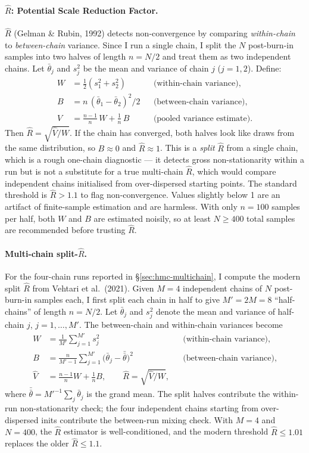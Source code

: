 \documentclass{article}
\begin{document}
\paragraph{$\hat{R}$: Potential Scale Reduction Factor.}
$\hat{R}$ (Gelman \& Rubin, 1992) detects non-convergence by comparing \emph{within-chain} to \emph{between-chain} variance. Since I run a single chain, I split the $N$ post-burn-in samples into two halves of length $n = N/2$ and treat them as two independent chains. Let $\bar\theta_j$ and $s_j^2$ be the mean and variance of chain $j$ ($j = 1, 2$). Define:
\begin{align}
W &= \tfrac{1}{2}(s_1^2 + s_2^2) && \text{(within-chain variance)}, \\
B &= n\,(\bar\theta_1 - \bar\theta_2)^2 / 2 && \text{(between-chain variance)}, \\
\hat{V} &= \tfrac{n-1}{n}\,W + \tfrac{1}{n}\,B && \text{(pooled variance estimate)}.
\end{align}
Then $\hat{R} = \sqrt{\hat{V}/W}$. If the chain has converged, both halves look like draws from the same distribution, so $B \approx 0$ and $\hat{R} \approx 1$. This is a \emph{split} $\hat{R}$ from a single chain, which is a rough one-chain diagnostic --- it detects gross non-stationarity within a run but is not a substitute for a true multi-chain $\hat{R}$, which would compare independent chains initialised from over-dispersed starting points. The standard threshold is $\hat{R} > 1.1$ to flag non-convergence. Values slightly below 1 are an artifact of finite-sample estimation and are harmless. With only $n = 100$ samples per half, both $W$ and $B$ are estimated noisily, so at least $N \geq 400$ total samples are recommended before trusting $\hat{R}$.

\paragraph{Multi-chain split-$\hat R$.}
For the four-chain runs reported in \S\ref{sec:hmc-multichain}, I compute the modern split $\hat R$ from Vehtari et al.\ (2021). Given $M = 4$ independent chains of $N$ post-burn-in samples each, I first split each chain in half to give $M' = 2M = 8$ ``half-chains'' of length $n = N/2$. Let $\bar\theta_j$ and $s_j^2$ denote the mean and variance of half-chain $j$, $j = 1, \ldots, M'$. The between-chain and within-chain variances become
\begin{align}
W &= \frac{1}{M'}\sum_{j=1}^{M'} s_j^2&& \text{(within-chain variance)}, \\
B &= \frac{n}{M' - 1}\sum_{j=1}^{M'} \bigl(\bar\theta_j - \bar{\bar\theta}\bigr)^2 && \text{(between-chain variance)}, \\
\hat V &= \frac{n-1}{n} W + \frac{1}{n} B, \qquad \hat R = \sqrt{\hat V / W},
\label{eq:rhat-multichain}
\end{align}
where $\bar{\bar\theta} = M'^{-1}\sum_j \bar\theta_j$ is the grand mean. The split halves contribute the within-run non-stationarity check; the four independent chains starting from over-dispersed inits contribute the between-run mixing check. With $M = 4$ and $N = 400$, the $\hat R$ estimator is well-conditioned, and the modern threshold $\hat R \le 1.01$ replaces the older $\hat R \le 1.1$.
\end{document}
